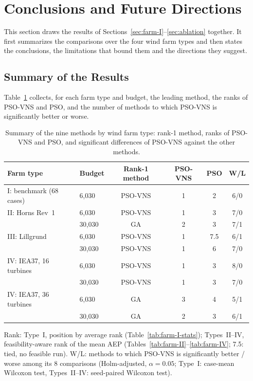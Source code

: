 \section{Conclusions and Future Directions}
\label{sec:discussion}
This section draws the results of Sections~\ref{sec:farm-I}--\ref{sec:ablation} together. It first summarizes the comparisons over the four wind farm types and then states the conclusions, the limitations that bound them and the directions they suggest.
\subsection{Summary of the Results}
\label{sec:farm-summary}
Table~\ref{tab:farm-summary} collects, for each farm type and budget, the leading method, the ranks of PSO-VNS and PSO, and the number of methods to which PSO-VNS is significantly better or worse.
\begin{table}[!htb]
\centering
\caption{Summary of the nine methods by wind farm type: rank-1 method, ranks of PSO-VNS and PSO, and significant differences of PSO-VNS against the other methods.}
\label{tab:farm-summary}
\footnotesize\setlength{\tabcolsep}{3pt}
\begin{tabular}{llcccc}
\toprule
Farm type & Budget & Rank-1 method & PSO-VNS & PSO & W/L \\
\midrule
I: benchmark (68 cases) & 6{,}030 & PSO-VNS & 1 & 2 & 6/0 \\
II: Horns Rev~1 & 6{,}030 & PSO-VNS & 1 & 3 & 7/0 \\
 & 30{,}030 & GA & 2 & 3 & 7/1 \\
III: Lillgrund & 6{,}030 & PSO-VNS & 1 & 7.5 & 6/1 \\
 & 30{,}030 & PSO-VNS & 1 & 6 & 7/0 \\
IV: IEA37, 16 turbines & 6{,}030 & PSO-VNS & 1 & 3 & 8/0 \\
 & 30{,}030 & PSO-VNS & 1 & 3 & 7/0 \\
IV: IEA37, 36 turbines & 6{,}030 & GA & 3 & 4 & 5/1 \\
 & 30{,}030 & GA & 2 & 3 & 6/1 \\
\bottomrule
\end{tabular}
\par\vspace{2pt}\parbox{\columnwidth}{\scriptsize Rank: Type~I, position by average rank (Table~\ref{tab:farm-I-stats}); Types~II--IV, feasibility-aware rank of the mean AEP (Tables~\ref{tab:farm-II}--\ref{tab:farm-IV}; 7.5: tied, no feasible run). W/L: methods to which PSO-VNS is significantly better / worse among its 8 comparisons (Holm-adjusted, $\alpha=0.05$; Type~I: case-mean Wilcoxon test, Types~II--IV: seed-paired Wilcoxon test).}
\end{table}


